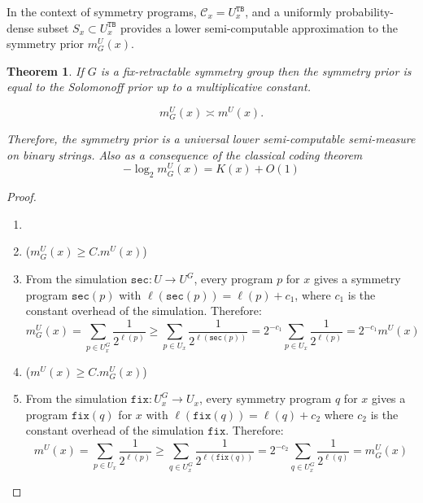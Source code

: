 \documentclass{article}
\newtheorem{theorem}{Theorem}[section]
\newcommand{\TB}{\mathtt{TB}}
\newcommand{\m}{m^U}
\newcommand{\ms}{m^U_G}
\newcommand{\fix}{\mathtt{fix}}
\newcommand{\s}{\mathtt{sec}}
\begin{document}
In the context of symmetry programs, $\mathcal{C}_x = U^{\TB}_x$, and a uniformly probability-dense subset $S_x \subset U_x^{\TB}$ provides a lower semi-computable approximation to the symmetry prior $\ms(x)$.


\begin{theorem}
\label{thm:universal}
If $G$ is a fix-retractable symmetry group then the symmetry prior is equal to the Solomonoff prior up to a multiplicative constant. 

\begin{equation}
    \ms(x) \asymp \m(x).
\end{equation}

Therefore, the symmetry prior is a \emph{universal} lower semi-computable semi-measure on binary strings. Also as a consequence of the classical coding theorem
 \begin{equation}
    -\log_2 \ms(x)= K(x) + O(1)
    \end{equation}

\end{theorem}

\begin{proof}
\begin{enumerate} 
    \item[]  
    \item ($\ms(x) \geq C. \m(x)$) 
    \item[] From the simulation $\s: U \to U^G$, every program $p$ for $x$ gives a symmetry program $\s(p)$ with $\ell(\s(p)) = \ell(p) + c_1$, where $c_1$ is the constant overhead of the simulation. Therefore: 
    \begin{equation}
        \ms(x) = \sum_{p \in U_x^G} \frac{1}{2^{\ell(p)}} \geq \sum_{p \in U_x} \frac{1}{2^{\ell({\s(p)})}} = 2^{-c_1}\sum_{p \in U_x} \frac{1}{2^{\ell(p)}} = 2^{-c_1} \m(x)
    \end{equation}
    \item ($\m(x) \geq C. \ms(x)$)
    \item[]
        From the simulation $\fix: U^G_x \to U_x$, every symmetry program $q$ for $x$ gives a program $\fix(q)$ for $x$ with $\ell(\fix(q)) = \ell(q) + c_2$ where $c_2$ is the constant overhead of the simulation $\fix$. Therefore:
        \begin{equation}
        \m(x) = \sum_{p \in U_x} \frac{1}{2^{\ell(p)}} \geq \sum_{q \in U^G_x} \frac{1}{2^{\ell(\fix(q))}} = 2^{-c_2}\sum_{q \in U^G_x} \frac{1}{2^{\ell(q)}} = \ms(x)
        \end{equation}

\end{enumerate}
\end{proof}
\end{document}
